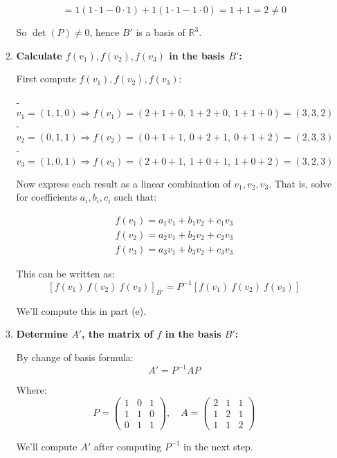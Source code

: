 \documentclass[12pt]{article}
\begin{document}
\begin{answerbox}
\begin{enumerate}
\begin{enumerate}
        $$
        = 1(1 \cdot 1 - 0 \cdot 1) + 1(1 \cdot 1 - 1 \cdot 0) = 1 + 1 = 2 \neq 0
        $$

        So $ \det(P) \neq 0 $, hence $ B' $ is a basis of $ \mathbb{R}^3 $.

        \item \textbf{Calculate $ f(v_1), f(v_2), f(v_3) $ in the basis $ B' $:}

        First compute $ f(v_1), f(v_2), f(v_3) $:

        - $ v_1 = (1, 1, 0) \Rightarrow f(v_1) = (2+1+0,\ 1+2+0,\ 1+1+0) = (3, 3, 2) $
        - $ v_2 = (0, 1, 1) \Rightarrow f(v_2) = (0+1+1,\ 0+2+1,\ 0+1+2) = (2, 3, 3) $
        - $ v_3 = (1, 0, 1) \Rightarrow f(v_3) = (2+0+1,\ 1+0+1,\ 1+0+2) = (3, 2, 3) $

        Now express each result as a linear combination of $ v_1, v_2, v_3 $. That is, solve for coefficients $ a_i, b_i, c_i $ such that:

        $$
        \begin{aligned}
        f(v_1) = a_1 v_1 + b_1 v_2 + c_1 v_3 \\
        f(v_2) = a_2 v_1 + b_2 v_2 + c_2 v_3 \\
        f(v_3) = a_3 v_1 + b_3 v_2 + c_3 v_3
        \end{aligned}
        $$

        This can be written as:
        $$
        [f(v_1)\ f(v_2)\ f(v_3)]_{B'} = P^{-1} [f(v_1)\ f(v_2)\ f(v_3)]
        $$

        We'll compute this in part (e).

        \item \textbf{Determine $ A' $, the matrix of $ f $ in the basis $ B' $:}

        By change of basis formula:
        $$
        A' = P^{-1} A P
        $$

        Where:
        $$
        P = \begin{pmatrix}
        1 & 0 & 1 \\
        1 & 1 & 0 \\
        0 & 1 & 1
        \end{pmatrix}, \quad
        A = \begin{pmatrix}
        2 & 1 & 1 \\
        1 & 2 & 1 \\
        1 & 1 & 2
        \end{pmatrix}
        $$

        We'll compute $ A' $ after computing $ P^{-1} $ in the next step.


\end{enumerate}
\end{enumerate}
\end{answerbox}
\end{document}

